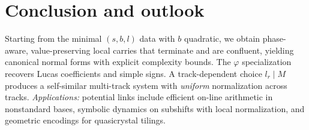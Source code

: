 \documentclass[11pt]{article}
\theoremstyle{definition}
\theoremstyle{remark}
\begin{document}
\section{Conclusion and outlook}
Starting from the minimal $(s,b,l)$ data with $b$ quadratic, we obtain phase-aware, value-preserving local carries that terminate and are confluent, yielding canonical normal forms with explicit complexity bounds. The $\varphi$ specialization recovers Lucas coefficients and simple signs. A track-dependent choice $l_r\mid M$ produces a self-similar multi-track system with \emph{uniform} normalization across tracks.
\emph{Applications:} potential links include efficient on-line arithmetic in nonstandard bases, symbolic dynamics on subshifts with local normalization, and geometric encodings for quasicrystal tilings.



\end{document}
